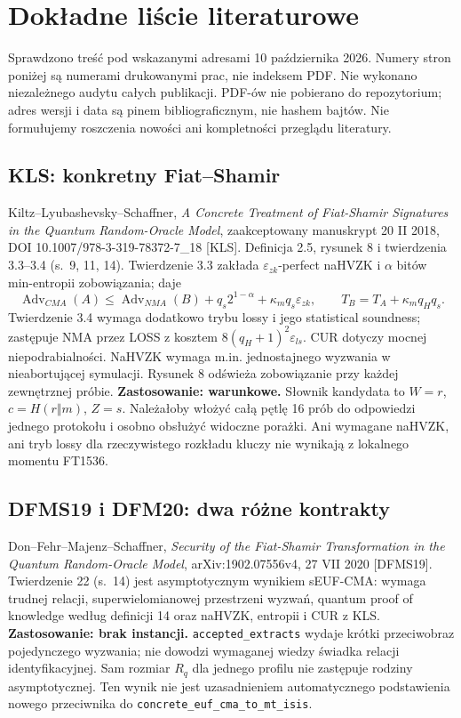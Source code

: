 \documentclass[11pt,a4paper]{article}
\newcommand{\code}[1]{\nolinkurl{#1}}
\begin{document}
\section{Dokładne liście literaturowe}
Sprawdzono treść pod wskazanymi adresami 10 października 2026.
Numery stron poniżej są numerami drukowanymi prac, nie indeksem PDF.
Nie wykonano niezależnego audytu całych publikacji. PDF-ów nie pobierano
do repozytorium; adres wersji i data są pinem bibliograficznym, nie hashem bajtów.
Nie formułujemy roszczenia nowości ani kompletności przeglądu literatury.

\subsection*{KLS: konkretny Fiat--Shamir}
Kiltz--Lyubashevsky--Schaffner, \emph{A Concrete Treatment of Fiat-Shamir
Signatures in the Quantum Random-Oracle Model}, zaakceptowany manuskrypt
20 II 2018, DOI 10.1007/978-3-319-78372-7\_18 [KLS].
Definicja 2.5, rysunek 8 i twierdzenia 3.3--3.4 (s.~9, 11, 14).
Twierdzenie 3.3 zakłada $\varepsilon_{zk}$-perfect naHVZK i $\alpha$ bitów
min-entropii zobowiązania; daje
\[
 \operatorname{Adv}_{CMA}(A)\le\operatorname{Adv}_{NMA}(B)
       +q_s2^{1-\alpha}+\kappa_m q_s\varepsilon_{zk},
 \qquad T_B=T_A+\kappa_m q_Hq_s.
\]
Twierdzenie 3.4 wymaga dodatkowo trybu lossy i jego statistical soundness;
zastępuje NMA przez LOSS z kosztem $8(q_H+1)^2\varepsilon_{ls}$.
CUR dotyczy mocnej niepodrabialności.
NaHVZK wymaga m.in. jednostajnego wyzwania w nieabortującej symulacji.
Rysunek 8 odświeża zobowiązanie przy każdej zewnętrznej próbie.
\textbf{Zastosowanie: warunkowe.} Słownik kandydata to $W=r$, $c=H(r\Vert m)$,
$Z=s$. Należałoby włożyć całą pętlę 16 prób do odpowiedzi jednego protokołu
i osobno obsłużyć widoczne porażki. Ani wymagane naHVZK, ani tryb lossy
dla rzeczywistego rozkładu kluczy nie wynikają z lokalnego momentu FT1536.

\subsection*{DFMS19 i DFM20: dwa różne kontrakty}
Don--Fehr--Majenz--Schaffner, \emph{Security of the Fiat-Shamir Transformation
in the Quantum Random-Oracle Model}, arXiv:1902.07556v4, 27 VII 2020 [DFMS19].
Twierdzenie 22 (s.~14) jest asymptotycznym wynikiem sEUF-CMA: wymaga trudnej
relacji, superwielomianowej przestrzeni wyzwań, quantum proof of knowledge
według definicji 14 oraz naHVZK, entropii i CUR z KLS.
\textbf{Zastosowanie: brak instancji.} \code{accepted_extracts} wydaje krótki
przeciwobraz pojedynczego wyzwania; nie dowodzi wymaganej wiedzy świadka
relacji identyfikacyjnej. Sam rozmiar $R_q$ dla jednego profilu nie zastępuje
rodziny asymptotycznej. Ten wynik nie jest uzasadnieniem automatycznego
podstawienia nowego przeciwnika do \code{concrete_euf_cma_to_mt_isis}.
\end{document}

